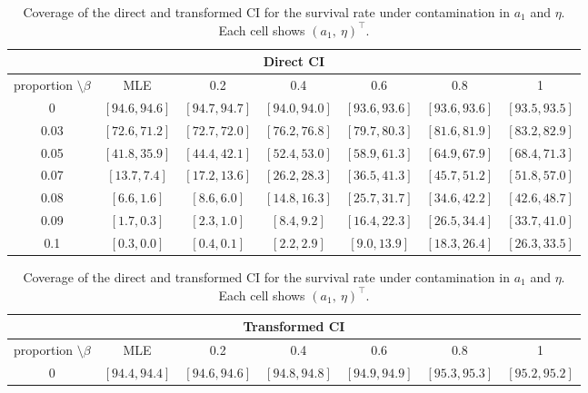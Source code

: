 \documentclass{article}
\begin{document}
\begin{table}[htbp]
\centering
\caption{Coverage of the direct and transformed CI for the survival rate under contamination in $a_1$ and $\eta$. Each cell shows $\left(a_1,\ \eta \right)^{\intercal}$.}
\label{tab:table_CI_survival}
\renewcommand{\arraystretch}{1.18}
\small

\begin{tabular}{c|cccccc}
\hline
\multicolumn{7}{c}{\textbf{Direct CI}} \\
\hline
proportion $\setminus \beta$ & MLE & 0.2 & 0.4 & 0.6 & 0.8 & 1 \\ 
\hline

0 &
$[94.6,94.6]$ &
$[94.7,94.7]$ &
$[94.0,94.0]$ &
$[93.6,93.6]$ &
$[93.6,93.6]$ &
$[93.5,93.5]$
\\

0.03 &
$[72.6,71.2]$ &
$[72.7,72.0]$ &
$[76.2,76.8]$ &
$[79.7,80.3]$ &
$[81.6,81.9]$ &
$[83.2,82.9]$
\\

0.05 &
$[41.8,35.9]$ &
$[44.4,42.1]$ &
$[52.4,53.0]$ &
$[58.9,61.3]$ &
$[64.9,67.9]$ &
$[68.4,71.3]$
\\

0.07 &
$[13.7,7.4]$ &
$[17.2,13.6]$ &
$[26.2,28.3]$ &
$[36.5,41.3]$ &
$[45.7,51.2]$ &
$[51.8,57.0]$
\\

0.08 &
$[6.6,1.6]$ &
$[8.6,6.0]$ &
$[14.8,16.3]$ &
$[25.7,31.7]$ &
$[34.6,42.2]$ &
$[42.6,48.7]$
\\

0.09 &
$[1.7,0.3]$ &
$[2.3,1.0]$ &
$[8.4,9.2]$ &
$[16.4,22.3]$ &
$[26.5,34.4]$ &
$[33.7,41.0]$
\\

0.1 &
$[0.3,0.0]$ &
$[0.4,0.1]$ &
$[2.2,2.9]$ &
$[9.0,13.9]$ &
$[18.3,26.4]$ &
$[26.3,33.5]$
\\

\end{tabular}

\vspace{0.6cm}

\begin{tabular}{c|cccccc}
\hline
\multicolumn{7}{c}{\textbf{Transformed CI}} \\
\hline
proportion $\setminus \beta$ & MLE & 0.2 & 0.4 & 0.6 & 0.8 & 1 \\ 
\hline

0 &
$[94.4,94.4]$ &
$[94.6,94.6]$ &
$[94.8,94.8]$ &
$[94.9,94.9]$ &
$[95.3,95.3]$ &
$[95.2,95.2]$
\\


\end{tabular}
\end{table}
\end{document}
